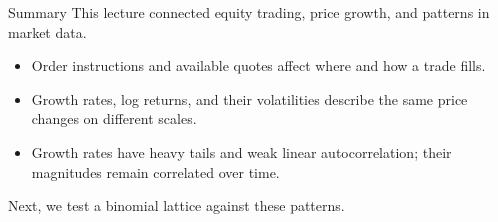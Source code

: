 \documentclass[aspectratio=169,11pt]{beamer}
\begin{document}
\begin{frame}{Summary}
  This lecture connected equity trading, price growth, and patterns in market data.

  \vspace{0.8em}
  {\large\textbf{}}
  \vspace{0.4em}
  \begin{itemize}\setlength{\itemsep}{0.7em}
    \item \textbf{}
      Order instructions and available quotes affect where and how a trade fills.
    \item \textbf{}
      Growth rates, log returns, and their volatilities describe the same
      price changes on different scales.
    \item \textbf{}
      Growth rates have heavy tails and weak linear autocorrelation;
      their magnitudes remain correlated over time.
  \end{itemize}

  \vspace{0.6em}
  Next, we test a binomial lattice against these patterns.
\end{frame}

\end{document}
